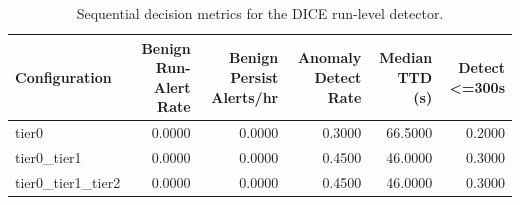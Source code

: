 \begin{table}[t]
\centering
\caption{Sequential decision metrics for the DICE run-level detector.}
\label{tab:dice_sequential_metrics}
\footnotesize
\begin{tabular}{lrrrrr}
\toprule
Configuration & Benign Run-Alert Rate & Benign Persist Alerts/hr & Anomaly Detect Rate & Median TTD (s) & Detect <=300s \\
\midrule
tier0 & 0.0000 & 0.0000 & 0.3000 & 66.5000 & 0.2000 \\
tier0_tier1 & 0.0000 & 0.0000 & 0.4500 & 46.0000 & 0.3000 \\
tier0_tier1_tier2 & 0.0000 & 0.0000 & 0.4500 & 46.0000 & 0.3000 \\
\bottomrule
\end{tabular}

\end{table}
